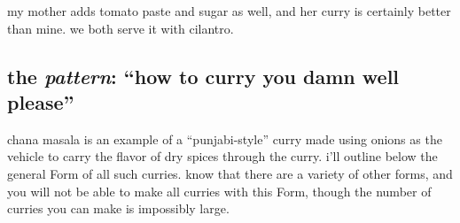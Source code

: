 my mother adds tomato paste and sugar as well, and her curry is certainly 
better than mine. we both serve it with cilantro.

\subsection{the \textit{pattern}: ``how to curry  you damn well please''}

chana masala is an example of a ``punjabi-style'' curry made using onions as 
the vehicle to carry the flavor of dry spices through the curry. i'll outline 
below the general Form of all such curries. know that there are a variety of 
other forms, and you will not be able to make all curries with this Form, 
though the number of curries you can make is impossibly large.

